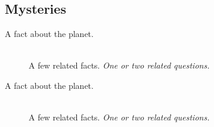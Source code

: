 \documentclass[11pt, a5paper, parskip=half-, DIV=12]{scrartcl}
\begin{document}
\subsection*{Mysteries}
\begin{description}
	\item[A fact about the planet.] \phantom{a} \\ A few related facts. \textit{One or two related questions.}
	\item[A fact about the planet.] \phantom{a} \\ A few related facts. \textit{One or two related questions.}
\end{description}

\newpage



\newpage

\thispagestyle{empty}


\ClearShipoutPicture
{}

\phantom{a}
\end{document}
